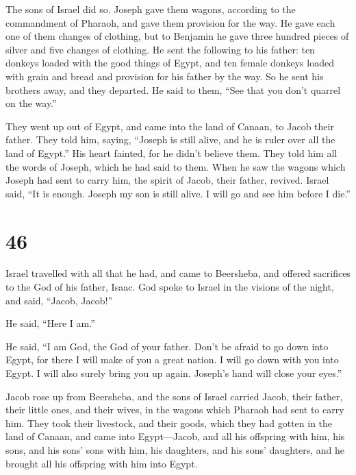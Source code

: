  The sons of Israel did so. Joseph gave them wagons,
according to the commandment of Pharaoh, and gave them provision for the
way.  He gave each one of them changes of clothing, but to
Benjamin he gave three hundred pieces of silver and five changes of
clothing.  He sent the following to his father: ten donkeys
loaded with the good things of Egypt, and ten female donkeys loaded with
grain and bread and provision for his father by the way. 
So he sent his brothers away, and they departed. He said to them, ``See
that you don't quarrel on the way.''

 They went up out of Egypt, and came into the land of
Canaan, to Jacob their father.  They told him, saying,
``Joseph is still alive, and he is ruler over all the land of Egypt.''
His heart fainted, for he didn't believe them.  They told
him all the words of Joseph, which he had said to them. When he saw the
wagons which Joseph had sent to carry him, the spirit of Jacob, their
father, revived.  Israel said, ``It is enough. Joseph my
son is still alive. I will go and see him before I die.''

\hypertarget{section-45}{%
\section{46}\label{section-45}}

 Israel travelled with all that he had, and came to
Beersheba, and offered sacrifices to the God of his father, Isaac.
 God spoke to Israel in the visions of the night, and said,
``Jacob, Jacob!''

He said, ``Here I am.''

 He said, ``I am God, the God of your father. Don't be
afraid to go down into Egypt, for there I will make of you a great
nation.  I will go down with you into Egypt. I will also
surely bring you up again. Joseph's hand will close your eyes.''

 Jacob rose up from Beersheba, and the sons of Israel
carried Jacob, their father, their little ones, and their wives, in the
wagons which Pharaoh had sent to carry him.  They took their
livestock, and their goods, which they had gotten in the land of Canaan,
and came into Egypt---Jacob, and all his offspring with him,
 his sons, and his sons' sons with him, his daughters, and
his sons' daughters, and he brought all his offspring with him into
Egypt.

